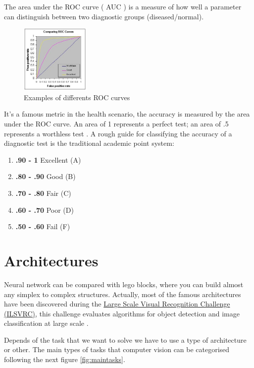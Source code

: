 The area under the ROC curve ( AUC ) is a measure of how well a parameter can distinguish between two diagnostic groups (diseased/normal). 

\begin{figure}[H]
\centering
\includegraphics[width=0.3\textwidth]{./figures/ROC}
\caption{Examples of differents ROC curves \cite{area-roc-curve}}
\end{figure}

It's a famous metric in the health scenario, the accuracy is measured by the area under the ROC curve. An area of 1 represents a perfect test; an area of .5 represents a worthless test \cite{area-roc-curve}. A rough guide for classifying the accuracy of a diagnostic test is the traditional academic point system:

\begin{enumerate}
\item \textbf{.90 - 1} Excellent (A)
\item \textbf{.80 - .90} Good (B)
\item \textbf{.70 - .80} Fair (C)
\item \textbf{.60 - .70} Poor (D)
\item \textbf{.50 - .60} Fail (F)
\end{enumerate}


\section[Architectures]{Architectures}

Neural network can be compared with lego blocks, where you can build almost any simplex to complex structures. Actually, most of the famous architectures have been discovered during the 
\href{http://www.image-net.org/challenges/LSVRC/}{Large Scale Visual Recognition Challenge (ILSVRC)},  this challenge evaluates algorithms for object detection and image classification at large scale \cite{architectures}.

Depends of the task that we want to solve we have to use a type of architecture or other. The main types of tasks that computer vision can be categorised following the next figure \ref{fig:maintasks}.

